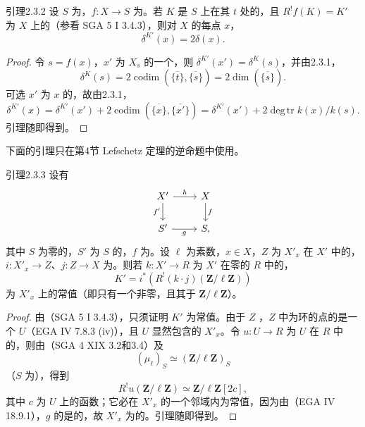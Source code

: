 \begin{SGAresult}{引理}{2.3.2}
设 $S$ 为，$f:X\to S$ 为。若 $K$ 是 $S$ 上在其 $t$ 处的，且 $R^!f(K)=K'$ 为 $X$ 上的（参看 SGA 5 I 3.4.3），则对 $X$ 的每点 $x$，
\[\delta^{K'}(x)=2\delta(x).\]
\end{SGAresult}
\begin{proof}
令 $s=f(x)$，$x'$ 为 $X_s$ 的一个，则 $\delta^{K'}(x')=\delta^K(s)$，并由2.3.1，
\[\delta^K(s)=2\operatorname{codim}(\overline{\{t\}},\overline{\{s\}})=2\dim(\overline{\{s\}}).\]
可选 $x'$ 为 $x$ 的，故由2.3.1，
\[\delta^{K'}(x)=\delta^{K'}(x')+2\operatorname{codim}(\overline{\{x\}},\overline{\{x'\}})=\delta^{K'}(x')+2\operatorname{deg\,tr}k(x)/k(s).\]
引理随即得到。
\end{proof}
下面的引理只在第4节 Lefschetz 定理的逆命题中使用。
\begin{SGAresult}{引理}{2.3.3}
设有
\[\begin{tikzcd}X'\arrow[r,"h"]\arrow[d,"f'"']&X\arrow[d,"f"]\\S'\arrow[r,"g"']&S,\end{tikzcd}\]
其中 $S$ 为零的，$S'$ 为 $S$ 的，$f$ 为。设 $\ell$ 为素数，$x\in X$，$Z$ 为 $X'_x$ 在 $X'$ 中的，
$i:X'_x\to Z$、$j:Z\to X$ 为。则若 $k:X'\to R$ 为 $X'$ 在零的 $R$ 中的，
\[K'=i^*(R^!(k\cdot j)(\mathbf Z/\ell\mathbf Z))\]
为 $X'_x$ 上的常值（即只有一个非零，且其于 $\mathbf Z/\ell\mathbf Z$）。
\end{SGAresult}
\begin{proof}
由（SGA 5 I 3.4.3），只须证明 $K'$ 为常值。由于 $Z$ ，$Z$ 中为环的点的是一个 $U$（EGA IV 7.8.3 (iv)），且 $U$ 显然包含的 $X'_x$。令 $u:U\to R$ 为 $U$ 在 $R$ 中的，则由（SGA 4 XIX 3.2和3.4）及
\[(\mu_\ell)_S\simeq(\mathbf Z/\ell\mathbf Z)_S\]
（$S$ 为），得到
\[R^!u(\mathbf Z/\ell\mathbf Z)\simeq\mathbf Z/\ell\mathbf Z[2c],\]
其中 $c$ 为 $U$ 上的函数；它必在 $X'_x$ 的一个邻域内为常值，因为由（EGA IV 18.9.1），$g$ 的是的，故 $X'_x$ 为的。引理随即得到。
\end{proof}
